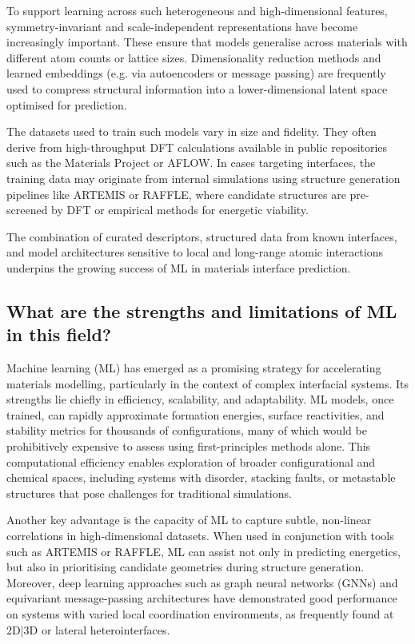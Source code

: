 To support learning across such heterogeneous and high-dimensional features, symmetry-invariant and scale-independent representations have become increasingly important. These ensure that models generalise across materials with different atom counts or lattice sizes. Dimensionality reduction methods and learned embeddings (e.g. via autoencoders or message passing) are frequently used to compress structural information into a lower-dimensional latent space optimised for prediction.

The datasets used to train such models vary in size and fidelity. They often derive from high-throughput DFT calculations available in public repositories such as the Materials Project or AFLOW. In cases targeting interfaces, the training data may originate from internal simulations using structure generation pipelines like ARTEMIS or RAFFLE, where candidate structures are pre-screened by DFT or empirical methods for energetic viability.

The combination of curated descriptors, structured data from known interfaces, and model architectures sensitive to local and long-range atomic interactions underpins the growing success of ML in materials interface prediction.

\subsection{What are the strengths and limitations of ML in this field?}

Machine learning (ML) has emerged as a promising strategy for accelerating materials modelling, particularly in the context of complex interfacial systems. Its strengths lie chiefly in efficiency, scalability, and adaptability. ML models, once trained, can rapidly approximate formation energies, surface reactivities, and stability metrics for thousands of configurations, many of which would be prohibitively expensive to assess using first-principles methods alone. This computational efficiency enables exploration of broader configurational and chemical spaces, including systems with disorder, stacking faults, or metastable structures that pose challenges for traditional simulations.

Another key advantage is the capacity of ML to capture subtle, non-linear correlations in high-dimensional datasets. When used in conjunction with tools such as ARTEMIS or RAFFLE, ML can assist not only in predicting energetics, but also in prioritising candidate geometries during structure generation. Moreover, deep learning approaches such as graph neural networks (GNNs) and equivariant message-passing architectures have demonstrated good performance on systems with varied local coordination environments, as frequently found at 2D|3D or lateral heterointerfaces.


